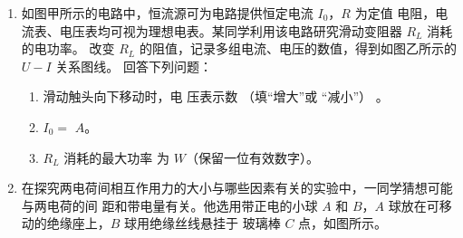 \begin{enumerate}
\item 
{}
如图甲所示的电路中，恒流源可为电路提供恒定电流 $ I_{0} $，$ R $ 为定值
电阻，电流表、电压表均可视为理想电表。某同学利用该电路研究滑动变阻器 $ R_{L} $ 消耗的电功率。
改变 $ R_{L} $ 的阻值，记录多组电流、电压的数值，得到如图乙所示的 $ U- I $ 关系图线。
回答下列问题：
\begin{figure}[h!]
\centering
\begin{subfigure}{0.4\linewidth}
\centering
 
\caption{}\label{}
\end{subfigure}
\begin{subfigure}{0.4\linewidth}
\centering
 
\caption{}\label{}
\end{subfigure}
\end{figure}



\begin{enumerate}
\item
滑动触头向下移动时，电
压表示数
\underlinegap 
（填“增大”或
“减小”）
。


\item 
$ I_{0} = $ \underlinegap $ A $。

\item 
$ R_{L} $ 消耗的最大功率
为
\underlinegap 
$ W $（保留一位有效数字）。




\end{enumerate}



\item 
{}
在探究两电荷间相互作用力的大小与哪些因素有关的实验中，一同学猜想可能与两电荷的间
距和带电量有关。他选用带正电的小球 $ A $ 和 $ B $，$ A $ 球放在可移动的绝缘座上，$ B $ 球用绝缘丝线悬挂于
玻璃棒 $ C $ 点，如图所示。
\begin{figure}[h!]
\centering

\end{figure}



\end{enumerate}
